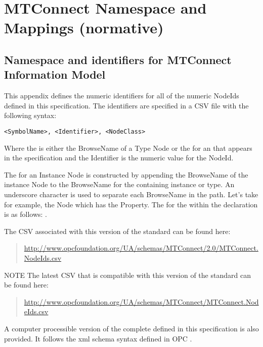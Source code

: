 
\section{MTConnect Namespace and  Mappings \newline (normative)}

\subsection{Namespace and identifiers for MTConnect Information Model}

This appendix defines the numeric identifiers for all of the numeric NodeIds defined in this specification. The identifiers are specified in a CSV file with the following syntax:

\texttt{<SymbolName>, <Identifier>, <NodeClass>}

Where the  is either the \gls{BrowseName} of a Type \gls{Node} or the  for an   that appears in the specification and the Identifier is the numeric value for the \gls{NodeId}.

The  for an Instance \gls{Node} is constructed by appending the \gls{BrowseName} of the instance \gls{Node} to the \gls{BrowseName} for the containing instance or type. An underscore character is used to separate each \gls{BrowseName} in the path. Let’s take for example, the   Node which has the  \gls{Property}. The  for the   within the  declaration is as follows: .

The CSV associated with this version of the standard can be found here:%
\begin{quote}
    \footnotesize{\url{http://www.opcfoundation.org/UA/schemas/MTConnect/2.0/MTConnect.NodeIds.csv}}
\end{quote}

NOTE The latest CSV that is compatible with this version of the standard can be found here:%
\begin{quote}
    \footnotesize{\url{http://www.opcfoundation.org/UA/schemas/MTConnect/MTConnect.NodeIds.csv}}
\end{quote}

A computer processible version of the complete  defined in this specification is also provided. It follows the \gls{xml}  schema syntax defined in OPC \cite{UAPart6}.

